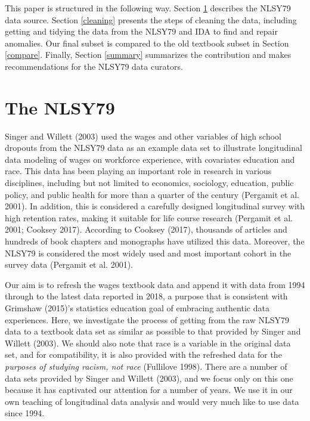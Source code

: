 \documentclass[12pt]{article}
\begin{document}
This paper is structured in the following way. Section \ref{database} describes the NLSY79 data source. Section \ref{cleaning} presents the steps of cleaning the data, including getting and tidying the data from the NLSY79 and IDA to find and repair anomalies. Our final subset is compared to the old textbook subset in Section \ref{compare}. Finally, Section \ref{summary} summarizes the contribution and makes recommendations for the NLSY79 data curators.

\hypertarget{database}{%
\section{The NLSY79}\label{database}}

Singer and Willett (2003) used the wages and other variables of high school dropouts from the NLSY79 data as an example data set to illustrate longitudinal data modeling of wages on workforce experience, with covariates education and race. This data has been playing an important role in research in various disciplines, including but not limited to economics, sociology, education, public policy, and public health for more than a quarter of the century (Pergamit et al. 2001). In addition, this is considered a carefully designed longitudinal survey with high retention rates, making it suitable for life course research (Pergamit et al. 2001; Cooksey 2017). According to Cooksey (2017), thousands of articles and hundreds of book chapters and monographs have utilized this data. Moreover, the NLSY79 is considered the most widely used and most important cohort in the survey data (Pergamit et al. 2001).

Our aim is to refresh the wages textbook data and append it with data from 1994 through to the latest data reported in 2018, a purpose that is consistent with Grimshaw (2015)'s statistics education goal of embracing authentic data experiences. Here, we investigate the process of getting from the raw NLSY79 data to a textbook data set as similar as possible to that provided by Singer and Willett (2003). We should also note that race is a variable in the original data set, and for compatibility, it is also provided with the refreshed data for the \emph{purposes of studying racism, not race} (Fullilove 1998). There are a number of data sets provided by Singer and Willett (2003), and we focus only on this one because it has captivated our attention for a number of years. We use it in our own teaching of longitudinal data analysis and would very much like to use data since 1994.
\end{document}
